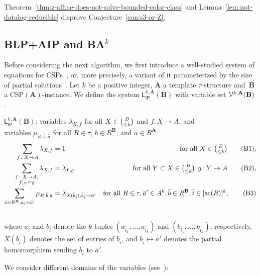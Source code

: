 \documentclass[a4paper,english, thm-restate]{lipics-v2021}
\newcommand{\tup}[1]{\bar{#1}}
\newcommand{\sig}{\tau}
\newcommand{\arity}[1]{\operatorname*{ar}(#1)}
\newcommand{\StructA}{\mathbf{A}}
\newcommand{\StructB}{\mathbf{B}}
\newcommand{\CSP}[1]{\mathrm{CSP}(#1)}
\newcommand{\restrict}[2]{#1|_{#2}}
\newcommand{\leqs}{\mathsf{L}}
\newcommand{\ipk}[3]{\leqs^{#1,#2}_{\mathsf{IP}} (#3)}
\begin{document}
	\noindent
	Theorem~\ref{thm:z-affine-does-not-solve-bounded-color-class}
	and Lemma~\ref{lem:not-datalog-reducible}
	disprove Conjecture~\ref{con:s3-or-Z}.
	
	\subsection{BLP+AIP and BA\texorpdfstring{$^k$}{k}}
	\label{app:BLP}
	Before considering the next algorithm,
	we first introduce a well-studied system of equations for CSPs~\cite{BartoBKO2021,BrakensiekGWZ2020}, or, more precisely, 
	a variant of it parameterized by the size of partial solutions~\cite{CiardoZivny2023GraphColoring}.
	Let $k$ be a positive integer, $\StructA$ a template $\sig$-structure
	and~$\StructB$ a $\CSP{\StructA}$-instance.
	We define the system
	$\ipk{k}{\StructA}{\StructB}$ with variable set $\VarsIP{k}{\StructA}{\StructB}$.
	\begin{systembox}{$\ipk{k}{\StructA}{\StructB}$: 
			variables $\lambda_{X,f}$ for all $X \in \tbinom{B}{\leq k}$ and  $f\colon X \to A$, and \\\phantom{$\ipk{k}{\StructA}{\StructB}$: }variables $\mu_{R,\tup{b},\tup{a}}$ for all $R \in \sig$, $\tup{b} \in R^\StructB$, and $\tup{a} \in R^\StructA$}
		\begin{align}
			\sum_{f \colon X \to A} \lambda_{X,f} &= 1  &\text{for all } X \in \tbinom{B}{\leq k} \label{eqn:ip-only-one-local-solution}\tag{B1},\\
			\sum_{\substack{f \colon X \to A,\\\restrict{f}{Y} = g}} \lambda_{X,f} &= \lambda_{Y,g} & \text{for all } Y\subset X \in \tbinom{B}{\leq k}, g\colon Y \to A\label{eqn:local-solutions-consistent}\tag{B2},\\
			\sum_{\tup{a} \in R^\StructA, a_{\tup{i}} = \tup{a}'} \mu_{R,\tup{b},\tup{a}} &= \lambda_{X(\tup{b}_{\tup{i}}), \tup{b}_{\tup{i}} \mapsto \tup{a}' } &  \text {for all } R \in \sig, \tup{a}' \in A^k, \tup{b} \in R^\StructB, \tup{i} \in [\arity{R}]^k,\label{eqn:ip-hom}\tag{B3}
		\end{align}\\
		where $a_{\tup{i}}$ and $b_{\tup{i}}$ denote the $k$-tuples $(a_{\tup{i}_1},...,a_{\tup{i}_k})$ and $(b_{\tup{i}_1},...,b_{\tup{i}_k})$, respectively, $X(\tup{b}_{\tup{i}})$ denotes the set of entries of $\tup{b}_{\tup{i}}$, and $\tup{b}_{\tup{i}} \mapsto \tup{a}'$ denotes the partial homomorphism sending $\tup{b}_{\tup{i}}$ to $\tup{a}'$.
	\end{systembox}
	\noindent We consider different domains of the variables (see~\cite{BrakensiekGWZ2020}):
\end{document}
